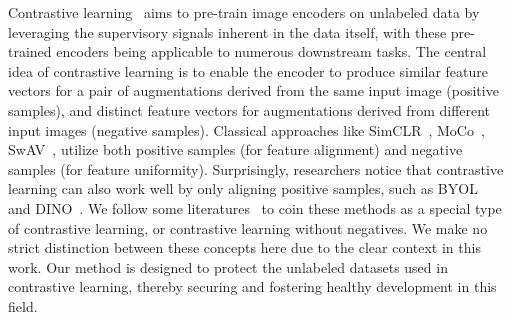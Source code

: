 Contrastive learning~\cite{chen2020simple,chen2021exploring,chen2021empirical,caron2020unsupervised,albelwi2022survey,he2020momentum} aims to pre-train image encoders on unlabeled data by leveraging the supervisory signals inherent in the data itself, with these pre-trained encoders being applicable to numerous downstream tasks. The central idea of contrastive learning is to enable the encoder to produce similar feature vectors for a pair of augmentations derived from the same input image (positive samples), and distinct feature vectors for augmentations derived from different input images (negative samples). Classical approaches like SimCLR~\cite{chen2020simple}, MoCo~\cite{he2020momentum}, SwAV~\cite{caron2020unsupervised}, utilize both positive samples (for feature alignment) and negative samples (for feature uniformity). Surprisingly, researchers notice that contrastive learning can also work well by only aligning positive samples, such as BYOL~\cite{grill2020bootstrap} and DINO~\cite{caron2021emerging}. We follow some literatures~\cite{albelwi2022survey,gao2022disco} to coin these methods as a special type of contrastive learning, or contrastive learning without negatives. We make no strict distinction between these concepts here due to the clear context in this work. Our method is designed to protect the unlabeled datasets used in contrastive learning, thereby securing and fostering healthy development in this field.